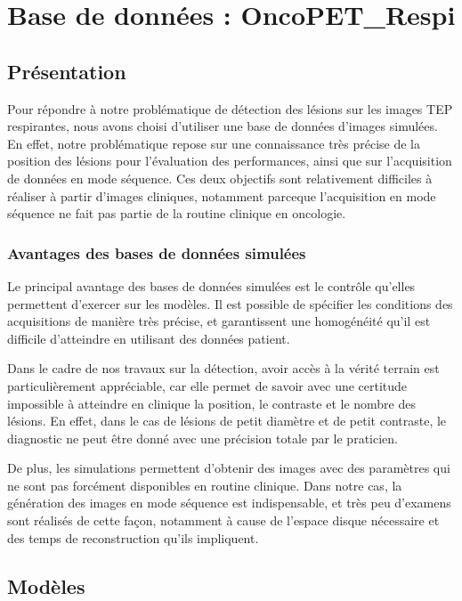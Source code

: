 \chapter{Base de données : OncoPET\_Respi}
	\label{lab:bdd}

\section{Présentation}

Pour répondre à notre problématique de détection des lésions sur les images TEP respirantes, nous avons choisi d’utiliser une base de données d’images simulées. En effet, notre problématique repose sur une connaissance très précise de la position des lésions pour l’évaluation des performances, ainsi que sur l’acquisition de données en mode séquence. Ces deux objectifs sont relativement difficiles à réaliser à partir d’images cliniques, notamment parceque l'acquisition en mode séquence ne fait pas partie de la routine clinique en oncologie.

	\subsection{Avantages des bases de données simulées}

Le principal avantage des bases de données simulées est le contrôle qu'elles permettent d'exercer sur les modèles. Il est possible de spécifier les conditions des acquisitions de manière très précise, et garantissent une homogénéité qu'il est difficile d'atteindre en utilisant des données patient.

Dans le cadre de nos travaux sur la détection, avoir accès à la vérité terrain est particulièrement appréciable, car elle permet de savoir avec une certitude impossible à atteindre en clinique la position, le contraste et le nombre des lésions. En effet, dans le cas de lésions de petit diamètre et de petit contraste, le diagnostic ne peut être donné avec une précision totale par le praticien. 

De plus, les simulations permettent d’obtenir des images avec des paramètres qui ne sont pas forcément disponibles en routine clinique. Dans notre cas, la génération des images en mode séquence est indispensable, et très peu d’examens sont réalisés de cette façon, notamment à cause de l’espace disque nécessaire et des temps de reconstruction qu'ils impliquent.

	\section{Modèles}

